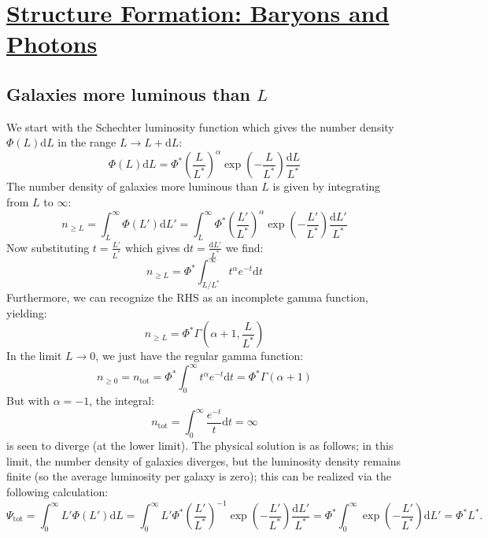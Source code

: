 \section[Structure Formation: Baryons and Photons]{\hyperlink{toc}{Structure Formation: Baryons and Photons}}

\subsection{Galaxies more luminous than $L$}
We start with the Schechter luminosity function which gives the number density $\Phi(L)\mathrm d L$ in the range $L \rightarrow L + \mathrm d L$:
\begin{equation}
    \Phi(L) \mathrm d L = \Phi^*\left(\frac{L}{L^*}\right)^\alpha\exp(-\frac{L}{L^*})\frac{\mathrm d L}{L^*}
\end{equation}
The number density of galaxies more luminous than $L$ is given by integrating from $L$ to $\infty$:
\begin{equation}
    n_{\geq L} = \int_L^\infty \Phi(L')\mathrm d L' = \int_L^\infty \Phi^*\left(\frac{L'}{L^*}\right)^\alpha\exp(-\frac{L'}{L^*})\frac{\mathrm d L'}{L^*}
\end{equation}
Now substituting $t = \frac{L'}{L^*}$ which gives $\mathrm d t = \frac{\mathrm d L'}{L^*}$ we find:
\begin{equation}
    n_{\geq L} = \Phi^* \int_{L/L^*}^\infty t^\alpha e^{-t} \mathrm d t
\end{equation}
Furthermore, we can recognize the RHS as an incomplete gamma function, yielding:
\begin{equation}
    \boxed{n_{\geq L} = \Phi^* \Gamma(\alpha + 1, \frac{L}{L^*})}
\end{equation}
In the limit $L \to 0$, we just have the regular gamma function:
\begin{equation}
    n_{\geq 0} = n_{\text{tot}} = \Phi^* \int_0^\infty t^\alpha e^{-t}\mathrm d t = \Phi^*\Gamma(\alpha + 1)
\end{equation}
But with $\alpha = -1$, the integral:
\begin{equation}
    n_{\text{tot}} =\int_0^\infty \frac{e^{-t}}{t}\mathrm d t = \infty
\end{equation}
is seen to diverge (at the lower limit). The physical solution is as follows; in this limit, the number density of galaxies diverges, but the luminosity density remains finite (so the average luminosity per galaxy is zero); this can be realized via the following calculation:
\begin{equation}
    \Psi_{\text{tot}} = \int_0^\infty L'\Phi(L')\mathrm d L = \int_0^\infty L'\Phi^*\left(\frac{L'}{L^*}\right)^{-1}\exp(-\frac{L'}{L^*})\frac{\mathrm d L'}{L^*} = 
    \Phi^*\int_0^\infty \exp(-\frac{L'}{L^*})\mathrm d L' = \Phi^*L^*.
\end{equation}


